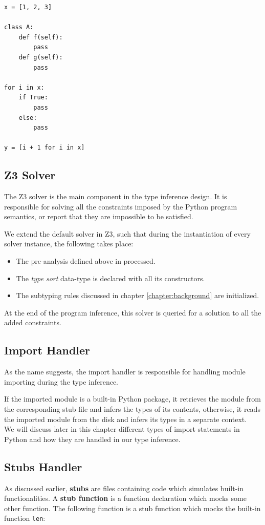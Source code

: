 \begin{lstlisting}
x = [1, 2, 3]

class A:
	def f(self):
		pass
	def g(self):
		pass
	
for i in x:
	if True:
		pass
	else:
		pass
		
y = [i + 1 for i in x]
\end{lstlisting}
\subsection{Z3 Solver}
The Z3 solver is the main component in the type inference design. It is responsible for solving all the constraints imposed by the Python program semantics, or report that they are impossible to be satisfied.

We extend the default solver in Z3, such that during the instantiation of every solver instance, the following takes place:

\begin{itemize}
	\item The pre-analysis defined above in processed.
	\item The \textit{type sort} data-type is declared with all its constructors.
	\item The subtyping rules discussed in chapter \ref{chapter:background} are initialized. 
\end{itemize}

At the end of the program inference, this solver is queried for a solution to all the added constraints.

\subsection{Import Handler}
As the name suggests, the import handler is responsible for handling module importing during the type inference.

If the imported module is a built-in Python package, it retrieves the module from the corresponding stub file and infers the types of its contents, otherwise, it reads the imported module from the disk and infers its types in a separate context.\\

We will discuss later in this chapter different types of import statements in Python and how they are handled in our type inference.
\subsection{Stubs Handler}
As discussed earlier, \textbf{stubs} are files containing code which simulates built-in functionalities. A \textbf{stub function} is a function declaration which mocks some other function. The following function is a stub function which mocks the built-in function \lstinline|len|:

